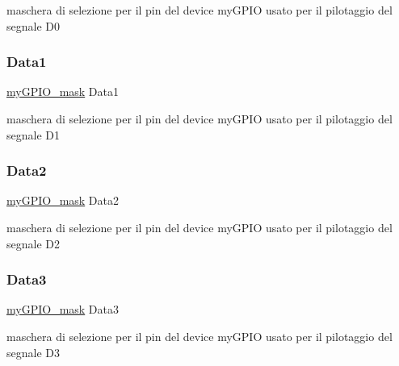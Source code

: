 maschera di selezione per il pin del device my\+G\+P\+IO usato per il pilotaggio del segnale D0 \mbox{\label{struct_h_d44780___l_c_d__t_a3f02fac6148faca9f183a786e0cf07d8}} 
\subsubsection{\texorpdfstring{Data1}{Data1}}
{\footnotesize\ttfamily \hyperlink{group__bare-metal_ga402a0d20afc0cb7c25554b8b023f4253}{my\+G\+P\+I\+O\+\_\+mask} Data1}

maschera di selezione per il pin del device my\+G\+P\+IO usato per il pilotaggio del segnale D1 \mbox{\label{struct_h_d44780___l_c_d__t_af0a0822c09b4802e36ac8044447de80a}} 
\subsubsection{\texorpdfstring{Data2}{Data2}}
{\footnotesize\ttfamily \hyperlink{group__bare-metal_ga402a0d20afc0cb7c25554b8b023f4253}{my\+G\+P\+I\+O\+\_\+mask} Data2}

maschera di selezione per il pin del device my\+G\+P\+IO usato per il pilotaggio del segnale D2 \mbox{\label{struct_h_d44780___l_c_d__t_a84205eb8dd4646c5e83dec2d77e78c39}} 
\subsubsection{\texorpdfstring{Data3}{Data3}}
{\footnotesize\ttfamily \hyperlink{group__bare-metal_ga402a0d20afc0cb7c25554b8b023f4253}{my\+G\+P\+I\+O\+\_\+mask} Data3}

maschera di selezione per il pin del device my\+G\+P\+IO usato per il pilotaggio del segnale D3 \mbox{\label{struct_h_d44780___l_c_d__t_a558b10ea85ca2ed99e34d38a2b4cf388}} 
